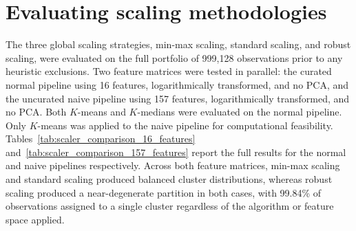     \section{Evaluating scaling methodologies}
\label{sec:results_minmax}

The three global scaling strategies, min-max scaling, standard scaling, and robust scaling, were evaluated on the full portfolio of 999,128 observations prior to any heuristic exclusions.
Two feature matrices were tested in parallel: the curated normal pipeline using 16 features, logarithmically transformed, and no PCA, and the uncurated naive pipeline using 157 features, logarithmically transformed, and no PCA.
Both $K$-means and $K$-medians were evaluated on the normal pipeline.
Only $K$-means was applied to the naive pipeline for computational feasibility.
Tables~\ref{tab:scaler_comparison_16_features} and~\ref{tab:scaler_comparison_157_features} report the full results for the normal and naive pipelines respectively.
Across both feature matrices, min-max scaling and standard scaling produced balanced cluster distributions, whereas robust scaling produced a near-degenerate partition in both cases, with 99.84\% of observations assigned to a single cluster regardless of the algorithm or feature space applied.
